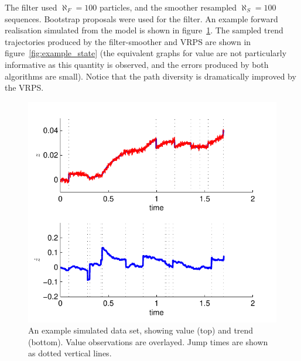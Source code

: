 \documentclass[10pt,twocolumn,twoside]{IEEEtran}
\begin{document}
The filter used $\aleph_F = 100$ particles, and the smoother resampled $\aleph_S = 100$ sequences. Bootstrap proposals were used for the filter. An example forward realisation simulated from the model is shown in figure~\ref{fig:example_data}. The sampled trend trajectories produced by the filter-smoother and VRPS are shown in figure~\ref{fig:example_state} (the equivalent graphs for value are not particularly informative as this quantity is observed, and the errors produced by both algorithms are small). Notice that the path diversity is dramatically improved by the VRPS.

\begin{figure}[!t]
\centering
\includegraphics[width=0.9\columnwidth]{example_data.pdf}
\caption{An example simulated data set, showing value (top) and trend (bottom). Value observations are overlayed. Jump times are shown as dotted vertical lines.}
\label{fig:example_data}
\end{figure}
\end{document}
